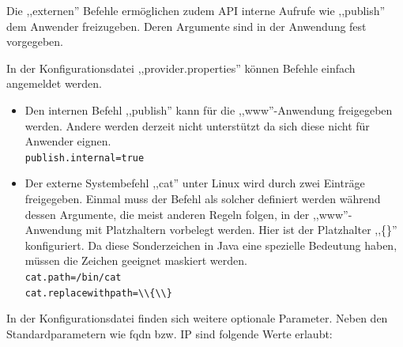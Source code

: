 \documentclass[oneside, ngerman, toc=bibliography,bibliography=totoc,listof=entryprefix, open=right,numbers=noenddot,fontsize=12pt]{scrbook}
\begin{document}
Die ,,externen'' Befehle ermöglichen zudem API interne Aufrufe wie ,,publish'' dem Anwender freizugeben.
Deren Argumente sind in der Anwendung fest vorgegeben. 

\bigskip
In der Konfigurationsdatei ,,provider.properties'' können Befehle einfach angemeldet werden.

\begin{itemize}
    \item Den internen Befehl ,,publish'' kann für die ,,www''-Anwendung freigegeben werden.
    Andere werden derzeit nicht unterstützt da sich diese nicht für Anwender eignen.\\
    \verb|publish.internal=true|
    
    \item Der externe Systembefehl ,,cat'' unter Linux wird durch zwei Einträge freigegeben. Einmal muss der Befehl als solcher definiert werden während dessen Argumente, die meist anderen Regeln folgen, in der ,,www''-Anwendung mit Platzhaltern vorbelegt werden. Hier ist der Platzhalter ,,\{\}'' konfiguriert. Da  diese Sonderzeichen in Java eine spezielle Bedeutung haben, müssen die Zeichen geeignet maskiert werden.
    \\
    \verb|cat.path=/bin/cat|\\
    \verb|cat.replacewithpath=\\{\\}|
    
\end{itemize}

 

In der Konfigurationsdatei finden sich weitere optionale Parameter. Neben den Standardparametern wie \acrshort{fqdn} bzw. IP sind folgende Werte erlaubt:\\
\end{document}
